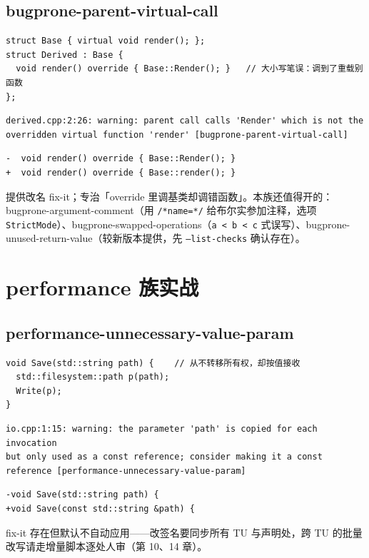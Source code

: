 \documentclass[12pt,a4paper,fontset=fandol]{ctexbook}
\begin{document}
\subsection{bugprone-parent-virtual-call}\label{sec:ch13-s1f}
\begin{lstlisting}[style=cppstyle]
struct Base { virtual void render(); };
struct Derived : Base {
  void render() override { Base::Render(); }   // 大小写笔误：调到了重载别函数
};
\end{lstlisting}
\begin{lstlisting}[style=shellstyle]
derived.cpp:2:26: warning: parent call calls 'Render' which is not the
overridden virtual function 'render' [bugprone-parent-virtual-call]
\end{lstlisting}
\begin{lstlisting}[style=diffstyle]
-  void render() override { Base::Render(); }
+  void render() override { Base::render(); }
\end{lstlisting}
提供改名 fix-it；专治「override 里调基类却调错函数」。本族还值得开的：bugprone-argument-comment（用 \texttt{/*name=*/} 给布尔实参加注释，选项 \texttt{StrictMode}）、bugprone-swapped-operations（\texttt{a < b < c} 式误写）、bugprone-unused-return-value（较新版本提供，先 \texttt{--list-checks} 确认存在）。

\section{performance 族实战}\label{sec:ch13-s2}
\subsection{performance-unnecessary-value-param}\label{sec:ch13-s2a}
\begin{lstlisting}[style=cppstyle]
void Save(std::string path) {    // 从不转移所有权，却按值接收
  std::filesystem::path p(path);
  Write(p);
}
\end{lstlisting}
\begin{lstlisting}[style=shellstyle]
io.cpp:1:15: warning: the parameter 'path' is copied for each invocation
but only used as a const reference; consider making it a const reference [performance-unnecessary-value-param]
\end{lstlisting}
\begin{lstlisting}[style=diffstyle]
-void Save(std::string path) {
+void Save(const std::string &path) {
\end{lstlisting}
fix-it 存在但默认不自动应用——改签名要同步所有 TU 与声明处，跨 TU 的批量改写请走增量脚本逐处人审（第 10、14 章）。
\end{document}
